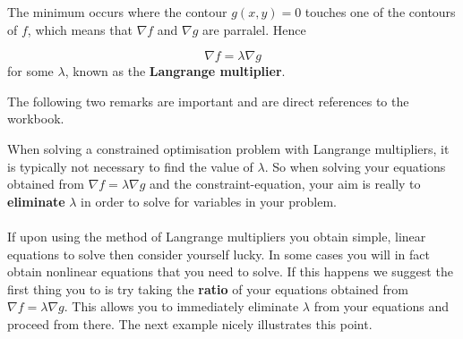 The minimum occurs where the contour \( g(x,y) = 0 \) touches one of the
contours of \( f \), which means that \( \nabla f \) and \( \nabla g \) are
parralel. Hence

\[ 
  \nabla f = \lambda \nabla g
\]
for some \( \lambda \), known as the \textbf{Langrange multiplier}.

\begin{center}
\end{center}

\begin{note}
The following two remarks are important and are direct references to the
workbook.
\end{note}

\begin{remark}
When solving a constrained optimisation problem with Langrange multipliers, it
is typically not necessary to find the value of \( \lambda \). So when solving
your equations obtained from \( \nabla f = \lambda \nabla g\) and the
constraint-equation, your aim is really to \textbf{eliminate} \( \lambda \) in
order to solve for variables in your problem. \\\\
If upon using the method of Langrange multipliers you obtain simple, linear
equations to solve then consider yourself lucky. In some cases you will in fact
obtain nonlinear equations that you need to solve. If this happens we suggest
the first thing you to is try taking the \textbf{ratio} of your equations
obtained from \( \nabla f = \lambda \nabla g \). This allows you to immediately
eliminate \( \lambda \) from your equations and proceed from there. The next
example nicely illustrates this point.
\end{remark}



